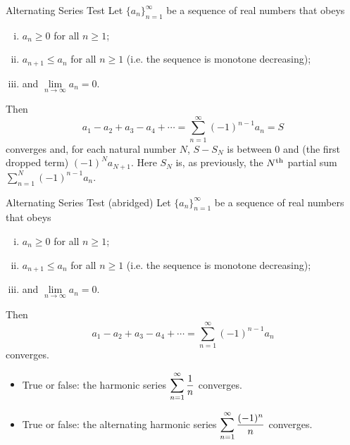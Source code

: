 \begin{frame}[t]
\begin{block}{Alternating Series Test}
Let $\big\{a_n\big\}_{n=1}^\infty$
be a sequence of real numbers that obeys
\begin{enumerate}[(i)]
\item $a_n\ge 0$ for all $n\ge 1$;
\item $a_{n+1}\le a_n$  for all $n\ge 1$ (i.e. the
sequence is monotone decreasing);
\item  and $\lim\limits_{n\rightarrow\infty}a_n=0$.
\end{enumerate}
Then
\begin{equation*}
a_1-a_2+a_3-a_4+\cdots=\sum\limits_{n=1}^\infty (-1)^{n-1} a_n =S
\end{equation*}
converges and, for each natural number $N$,  
$S-S_N$ is between $0$ and (the
first dropped term) $(-1)^N a_{N+1}$. Here $S_N$ is, as previously,
the $N^{\rm th}$ partial sum $\sum\limits_{n=1}^N (-1)^{n-1} a_n$.
\end{block}
\end{frame}
\begin{frame}
\begin{block}{Alternating Series Test (abridged)}
Let $\big\{a_n\big\}_{n=1}^\infty$
be a sequence of real numbers that obeys
\begin{enumerate}[(i)]
\item $a_n\ge 0$ for all $n\ge 1$;
\item $a_{n+1}\le a_n$  for all $n\ge 1$ (i.e. the
sequence is monotone decreasing);
\item  and $\lim\limits_{n\rightarrow\infty}a_n=0$.
\end{enumerate}
Then
\begin{equation*}
a_1-a_2+a_3-a_4+\cdots=\sum\limits_{n=1}^\infty (-1)^{n-1} a_n
\end{equation*}
converges.
\end{block}
\begin{itemize}
\item True or false: the harmonic series $\displaystyle\sum_{n=1}^\infty \frac{1}{n}$ converges.
\item True or false: the alternating harmonic series 
$\displaystyle\sum_{n=1}^\infty \frac{(-1)^n}{n}$ 
converges.
\end{itemize}
\MoreSpace
\end{frame}

